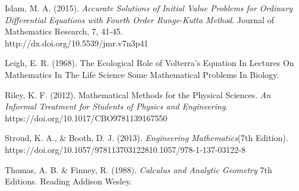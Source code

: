 \documentclass[11pt]{report}
\begin{document}
\begin{description}
	
		\item Islam, M. A. (2015). \emph{Accurate Solutions of Initial Value Problems for Ordinary Differential Equations with Fourth Order Runge-Kutta Method}. Journal of Mathematics Research, 7, 41-45. \\http://dx.doi.org/10.5539/jmr.v7n3p41
		
		\item Leigh, E. R. (1968). The Ecological Role of Volterra’s Equation In Lectures On Mathematics In The Life Science Some Mathematical Problems In Biology.
	
		
		\item Riley, K. F. (2012). Mathematical Methods for the Physical Sciences. \emph{An Informal Treatment for Students of Physics and Engineering}.\\ https://doi.org/10.1017/CBO9781139167550	
		
		\item Stroud, K. A., \& Booth, D. J. (2013). \emph{Engineering Mathematics}(7th Edition). \\ https://doi.org/10.1057/978113703122810.1057/978-1-137-03122-8
		
		\item Thomas, A. B. \& Finney, R. (1988). \emph{Calculus and Analytic Geometry} 7th Editions. Reading Addison Wesley.
	\end{description}
	
\end{document}

